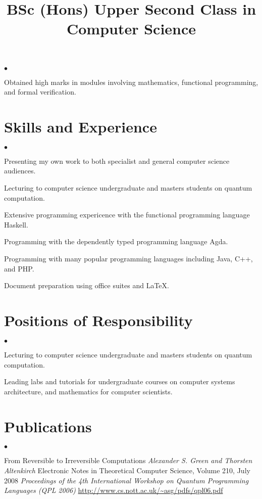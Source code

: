 \documentclass[line]{res}
\newenvironment{list2}{
  \begin{list}{$\bullet$}{%
      \setlength{\itemsep}{0in}
      \setlength{\parsep}{0.045in} \setlength{\parskip}{0in}
      \setlength{\topsep}{0in} \setlength{\partopsep}{0in}
      \setlength{\leftmargin}{0.2in}}}{\end{list}}
\begin{document}
\begin{resume}
\title{\bf{BSc (Hons) Upper Second Class in Computer Science}}
\begin{position}
\vspace{-4mm}
\begin{list2}
\item Obtained high marks in modules involving mathematics, functional programming, and formal verification.
\end{list2}
\end{position}

\vspace{-3mm}
\section{\sc Skills and Experience}

\begin{list2}
\item Presenting my own work to both specialist and general computer science audiences.
\item Lecturing to computer science undergraduate and masters students on quantum computation.
\item Extensive programming expericence with the functional programming language Haskell.
\item Programming with the dependently typed programming language Agda.
\item Programming with many popular programming languages including Java, C++, and PHP.
\item Document preparation using office suites and LaTeX.
\end{list2}

\vspace{-3mm}
\section{\sc Positions of Responsibility}
\begin{list2}
\item Lecturing to computer science undergraduate and masters students on quantum computation.
\item Leading labs and tutorials for undergraduate courses on computer systems architecture, and mathematics for computer scientists.
\end{list2}

\vspace{-3mm}
\section{\sc Publications}
\begin{list2}
\item From Reversible to Irreversible Computations 
\emph{Alexander S. Green and Thorsten Altenkirch}
Electronic Notes in Theoretical Computer Science, Volume 210, July 2008
\emph{Proceedings of the 4th International Workshop on Quantum Programming Languages (QPL 2006)}
\url{http://www.cs.nott.ac.uk/~asg/pdfs/qpl06.pdf}


\end{list2}
\end{resume}
\end{document}
